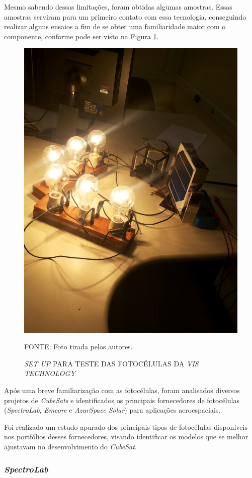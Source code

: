 \documentclass[
	12pt,				%
	openright,			%
	oneside,			%
	a4paper,			%
	english,			%
	french,				%
	spanish,			%
	brazil,				%
	oldfontcommands
	]{abntex2}
\begin{document}
	Mesmo sabendo dessas limitações, foram obtidas algumas amostras. Essas amostras serviram para um primeiro contato com essa tecnologia, conseguindo realizar alguns ensaios a fim de se obter uma familiaridade maior com o componente, conforme pode ser visto na Figura \ref{Fig_Cell_Setup}.
	
	\begin{figure}[th]
		\caption{\textit{SET UP} PARA TESTE DAS FOTOCÉLULAS DA \textit{VIS TECHNOLOGY}}
		\label{Fig_Cell_Setup}
		\centering
		\includegraphics[width=0.7\linewidth]{./figs/setup}
			
		\begin{small}
			FONTE: Foto tirada pelos autores.
		\end{small}		
	\end{figure}
	\pagebreak
	Após uma breve familiarização com as fotocélulas, foram analisados diversos projetos de \textit{CubeSats} e identificados os principais fornecedores de fotocélulas (\textit{SpectroLab}, \textit{Emcore} e \textit{AzurSpace Solar}) para aplicações aeroespaciais.
	
	Foi realizado um estudo apurado dos principais tipos de fotocélulas disponíveis nos portfólios desses fornecedores, visando identificar os modelos que se melhor ajustavam no desenvolvimento do \textit{CubeSat}.
	
\subsubsection[SpectroLab]{\textit{SpectroLab}}
	
\end{document}
